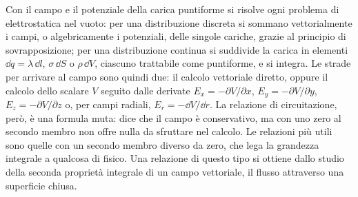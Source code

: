 \documentclass[11pt,a4paper]{article}
\begin{document}
Con il campo e il potenziale della carica puntiforme si risolve ogni problema di elettrostatica nel vuoto: per una distribuzione discreta si sommano vettorialmente i campi, o algebricamente i potenziali, delle singole cariche, grazie al principio di sovrapposizione; per una distribuzione continua si suddivide la carica in elementi $\dd q=\lambda\,\dd l$, $\sigma\,\dd S$ o $\rho\,\dd V$, ciascuno trattabile come puntiforme, e si integra. Le strade per arrivare al campo sono quindi due: il calcolo vettoriale diretto, oppure il calcolo dello scalare $V$ seguito dalle derivate $E_x=-\partial V/\partial x$, $E_y=-\partial V/\partial y$, $E_z=-\partial V/\partial z$ o, per campi radiali, $E_r=-\dd V/\dd r$. La relazione di circuitazione, però, è una formula muta: dice che il campo è conservativo, ma con uno zero al secondo membro non offre nulla da sfruttare nel calcolo. Le relazioni più utili sono quelle con un secondo membro diverso da zero, che lega la grandezza integrale a qualcosa di fisico. Una relazione di questo tipo si ottiene dallo studio della seconda proprietà integrale di un campo vettoriale, il flusso attraverso una superficie chiusa.
\end{document}
